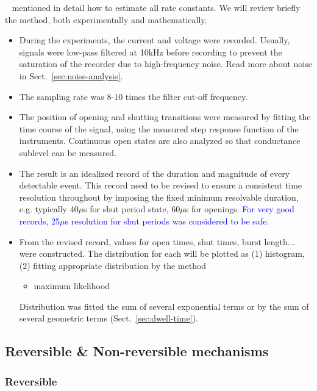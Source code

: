 ~\citep{colquhoun1985fes} mentioned in detail how to estimate all rate
constants. We will review briefly the method, both experimentally and
mathematically.
\begin{itemize}
\item During the experiments, the current and voltage were
  recorded. Usually, signals were low-pass filtered at 10kHz before
  recording to prevent the saturation of the recorder due to
  high-frequency noise. Read more about noise in
  Sect.~\ref{sec:noise-analysis}.

\item The sampling rate was 8-10 times the filter cut-off frequency.

\item The position of opening and shutting transitions were measured
  by fitting the time course of the signal, using the measured step
  response function of the instruments.  Continuous open states are
  also analyzed so that conductance sublevel can be measured.

\item The result is an idealized record of the duration and magnitude
  of every detectable event. This record need to be revised to ensure
  a consistent time resolution throughout by imposing the fixed
  minimum resolvable duration, e.g. typically 40$\mu$s for shut period
  state, 60$\mu$s for openings. \textcolor{blue}{For very good
    records, 25$\mu$s resolution for shut periods was considered to be
    safe.}

\item From the revised record, values for open times, shut times,
  burst length... were constructed. The distribution for each will be
  plotted as (1) histogram, (2) fitting appropriate distribution by
  the method
  \begin{itemize}
  \item maximum likelihood \citep{Horn1983}
  \end{itemize}
  Distribution was fitted the sum of several exponential terms or by
  the sum of several geometric terms (Sect.~\ref{sec:dwell-time}).
\end{itemize}



\subsection{Reversible \& Non-reversible mechanisms}

\subsubsection{Reversible}
\label{sec:reversible--reactions}
\label{sec:microscopic-reversibility}

